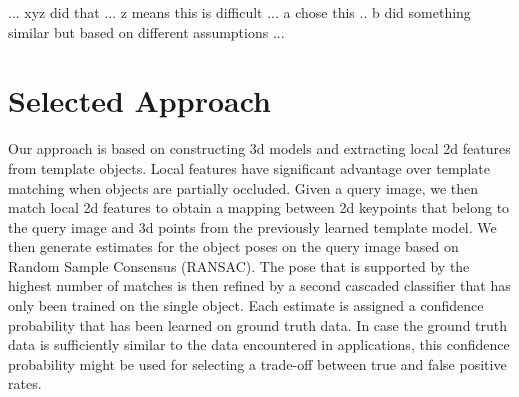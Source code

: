 ... xyz did that ... z means this is difficult ... a chose this .. b did something
similar but based on different assumptions ... 

\section{Selected Approach}

Our approach is based on constructing 3d models and extracting local 2d
features from template objects. Local features have significant advantage over
template matching when objects are partially occluded. %
Given a query image, we then match local 2d features to obtain a mapping
between 2d keypoints that belong to the query image and 3d points from the
previously learned template model. We then generate estimates for the object
poses on the query image based on Random Sample Consensus (RANSAC). The pose
that is supported by the highest number of matches is then refined by a second
cascaded classifier that has only been trained on the single object. Each
estimate is assigned a confidence probability that has been learned on ground
truth data. In case the ground truth data is sufficiently similar to the data
encountered in applications, this confidence probability might be used for
selecting a trade-off between true and false positive rates.%

